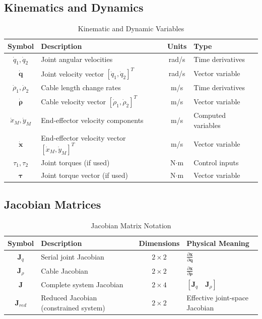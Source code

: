 \subsection{Kinematics and Dynamics}

\begin{table}[h!]
\centering
\caption{Kinematic and Dynamic Variables}
\begin{tabular}{|c|l|c|l|}
\hline
\textbf{Symbol} & \textbf{Description} & \textbf{Units} & \textbf{Type} \\
\hline
$\dot{q}_1, \dot{q}_2$ & Joint angular velocities & rad/s & Time derivatives \\
$\dot{\bm{q}}$ & Joint velocity vector $[\dot{q}_1, \dot{q}_2]^T$ & rad/s & Vector variable \\
$\dot{\rho}_1, \dot{\rho}_2$ & Cable length change rates & m/s & Time derivatives \\
$\dot{\bm{\rho}}$ & Cable velocity vector $[\dot{\rho}_1, \dot{\rho}_2]^T$ & m/s & Vector variable \\
$\dot{x}_M, \dot{y}_M$ & End-effector velocity components & m/s & Computed variables \\
$\dot{\bm{x}}$ & End-effector velocity vector $[\dot{x}_M, \dot{y}_M]^T$ & m/s & Vector variable \\
$\tau_1, \tau_2$ & Joint torques (if used) & N$\cdot$m & Control inputs \\
$\bm{\tau}$ & Joint torque vector (if used) & N$\cdot$m & Vector variable \\
\hline
\end{tabular}
\end{table}

\subsection{Jacobian Matrices}

\begin{table}[h!]
\centering
\caption{Jacobian Matrix Notation}
\begin{tabular}{|c|l|c|l|}
\hline
\textbf{Symbol} & \textbf{Description} & \textbf{Dimensions} & \textbf{Physical Meaning} \\
\hline
$\bm{J}_q$ & Serial joint Jacobian & $2 \times 2$ & $\frac{\partial \bm{x}}{\partial \bm{q}}$ \\
$\bm{J}_{\rho}$ & Cable Jacobian & $2 \times 2$ & $\frac{\partial \bm{x}}{\partial \bm{\rho}}$ \\
$\bm{J}$ & Complete system Jacobian & $2 \times 4$ & $[\bm{J}_q \quad \bm{J}_{\rho}]$ \\
$\bm{J}_{red}$ & Reduced Jacobian (constrained system) & $2 \times 2$ & Effective joint-space Jacobian \\
\hline
\end{tabular}
\end{table}

